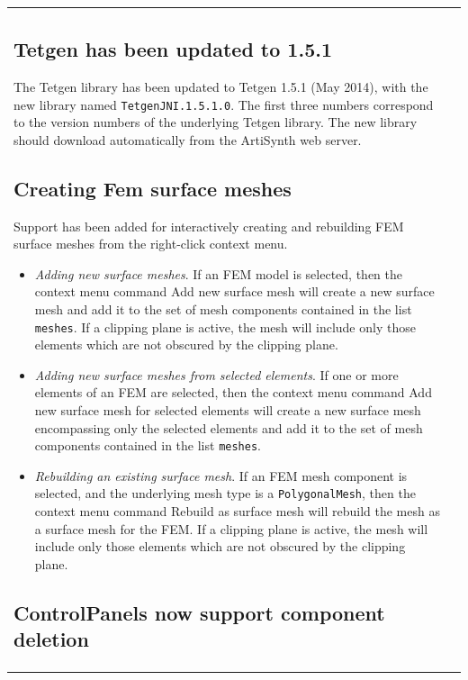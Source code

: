 \documentclass{article}
\begin{document}
\begin{tabular}{ll}
\subsection*{Tetgen has been updated to 1.5.1}

The Tetgen library has been updated to Tetgen 1.5.1 (May 2014), with
the new library named {\tt TetgenJNI.1.5.1.0}. The first three numbers
correspond to the version numbers of the underlying Tetgen library.
The new library should download automatically from the ArtiSynth web
server.

\subsection*{Creating Fem surface meshes}

Support has been added for interactively creating and rebuilding FEM
surface meshes from the right-click context menu.

\begin{itemize}

\item {\it Adding new surface meshes}. If an FEM model is selected,
then the context menu command {\sf Add new surface mesh} will create a
new surface mesh and add it to the set of mesh components contained in the
list {\tt meshes}. If a clipping plane is active, the mesh
will include only those elements which are not obscured by the
clipping plane.

\item {\it Adding new surface meshes from selected elements}. If one
or more elements of an FEM are selected, then the context menu command
{\sf Add new surface mesh for selected elements} will create a new
surface mesh encompassing only the selected elements and add it to the
set of mesh components contained in the list {\tt meshes}.

\item {\it Rebuilding an existing surface mesh}. If an FEM mesh
component is selected, and the underlying mesh type is a {\tt PolygonalMesh},
then the context menu command {\sf Rebuild as surface mesh} will
rebuild the mesh as a surface mesh for the FEM. If a clipping plane is
active, the mesh will include only those elements which are not
obscured by the clipping plane.

\end{itemize}

\subsection*{ControlPanels now support component deletion}


\end{tabular}
\end{document}
